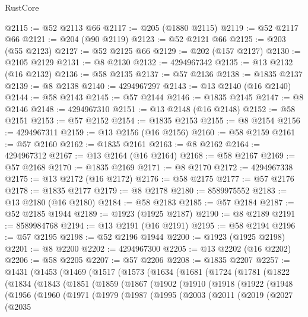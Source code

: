 \begin{lexlean}{RustCore}
\begin{coremodule}
@2115 := @52 @2113 @66
@2117 := @205 (@1880 @2115)
@2119 := @52 @2117 @66
@2121 := @204 (@90 @2119)
@2123 := @52 @2121 @66
@2125 := @203 (@55 @2123)
@2127 := @52 @2125 @66
@2129 := @202 (@157 @2127)
@2130 := @2105 @2129
@2131 := @8 @2130
@2132 := 4294967342
@2135 := @13 @2132 (@16 @2132)
@2136 := @58 @2135
@2137 := @57 @2136
@2138 := @1835 @2137
@2139 := @8 @2138
@2140 := 4294967297
@2143 := @13 @2140 (@16 @2140)
@2144 := @58 @2143
@2145 := @57 @2144
@2146 := @1835 @2145
@2147 := @8 @2146
@2148 := 4294967310
@2151 := @13 @2148 (@16 @2148)
@2152 := @58 @2151
@2153 := @57 @2152
@2154 := @1835 @2153
@2155 := @8 @2154
@2156 := 4294967311
@2159 := @13 @2156 (@16 @2156)
@2160 := @58 @2159
@2161 := @57 @2160
@2162 := @1835 @2161
@2163 := @8 @2162
@2164 := 4294967312
@2167 := @13 @2164 (@16 @2164)
@2168 := @58 @2167
@2169 := @57 @2168
@2170 := @1835 @2169
@2171 := @8 @2170
@2172 := 4294967338
@2175 := @13 @2172 (@16 @2172)
@2176 := @58 @2175
@2177 := @57 @2176
@2178 := @1835 @2177
@2179 := @8 @2178
@2180 := 8589975552
@2183 := @13 @2180 (@16 @2180)
@2184 := @58 @2183
@2185 := @57 @2184
@2187 := @52 @2185 @1944
@2189 := @1923 (@1925 @2187)
@2190 := @8 @2189
@2191 := 8589984768
@2194 := @13 @2191 (@16 @2191)
@2195 := @58 @2194
@2196 := @57 @2195
@2198 := @52 @2196 @1944
@2200 := @1923 (@1925 @2198)
@2201 := @8 @2200
@2202 := 4294967300
@2205 := @13 @2202 (@16 @2202)
@2206 := @58 @2205
@2207 := @57 @2206
@2208 := @1835 @2207
@2257 := @1431
    (@1453
      (@1469
        (@1517
          (@1573
            (@1634
              (@1681
                (@1724
                  (@1781
                    (@1822
                      (@1834
                        (@1843
                          (@1851
                            (@1859
                              (@1867
                                (@1902
                                  (@1910
                                    (@1918
                                      (@1922
                                        (@1948
                                          (@1956
                                            (@1960
                                              (@1971
                                                (@1979
                                                  (@1987
                                                    (@1995
                                                      (@2003
                                                        (@2011
                                                          (@2019
                                                            (@2027
                                                              (@2035

\end{coremodule}
\end{lexlean}
